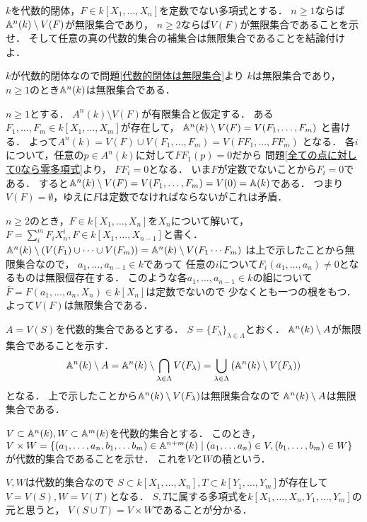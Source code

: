 \begin{prob}
  $k$を代数的閉体，$F\in k[X_1,\dots,X_n]$を定数でない多項式とする．
  $n\ge 1$ならば$\mathbb{A}^n(k) \setminus V(F)$が無限集合であり，
  $n\ge 2$ならば$V(F)$が無限集合であることを示せ．
  そして任意の真の代数的集合の補集合は無限集合であることを結論付けよ．
\end{prob}
\begin{ans}
  $k$が代数的閉体なので問題\ref{代数的閉体は無限集合}より
  $k$は無限集合であり，$n\ge 1$のとき$\mathbb{A}^n(k)$は無限集合である．
  
  $n\ge 1$とする．
  $A^n(k) \setminus V(F)$が有限集合と仮定する．
  ある$F_1, \dots, F_m \in k[X_1, \dots, X_m]$が存在して，
  $\mathbb{A}^n(k) \setminus V(F) = V(F_1, \dots , F_m)$
  と書ける．
  よって$A^n(k) = V(F) \cup V(F_1, \dots , F_m) = V( FF_1, \dots, FF_m)$
  となる．
  各$i$について，任意の$p \in A^n(k)$に対して$FF_1(p) = 0$だから
  問題\ref{全ての点に対して0なら零多項式}より，
  $FF_i = 0$となる．
  いま$F$が定数でないことから$F_i = 0$である．
  すると$\mathbb{A}^n(k) \setminus V(F) = V(F_1, \dots , F_m) = V(0) = \mathbb{A}(k)$である．
  つまり$V(F) = \emptyset$，ゆえに$F$は定数でなければならないがこれは矛盾．

  $n \ge 2$のとき，$F \in k[X_1,\dots,X_n]$を$X_n$について解いて，
  $F = \sum_{i}^m F_i X_n^i, F \in k[X_1,\dots,X_{n-1}]$と書く．
  $\mathbb{A}^n(k) \setminus (V(F_1) \cup \cdots \cup V(F_m)) = \mathbb{A}^n(k) \setminus V( F_1\cdots F_m )$
  は上で示したことから無限集合なので，
  $a_1, \dots, a_{n-1} \in k$であって
  任意の$i$について$F_i(a_1, \dots, a_n) \ne 0$となるものは無限個存在する．
  このような各$a_1, \dots, a_{n-1} \in k$の組について
  $\bar{F} = F(a_1, \dots, a_n, X_n) \in k[X_n]$は定数でないので
  少なくとも一つの根をもつ．
  よって$V(F)$は無限集合である．

  $A = V(S)$を代数的集合であるとする．
  $S = \{ F_{\lambda} \}_{\lambda\in\Lambda}$とおく．
  $\mathbb{A}^n(k) \setminus A$が無限集合であることを示す．
  \[ \mathbb{A}^n(k) \setminus A
  = \mathbb{A}^n(k) \setminus \bigcap_{\lambda\in\Lambda} V(F_{\lambda})
  = \bigcup_{\lambda\in\Lambda} \left( \mathbb{A}^n(k) \setminus V(F_{\lambda}) \right) \]
  となる．
  上で示したことから$\mathbb{A}^n(k) \setminus V(F_{\lambda})$は無限集合なので
  $ \mathbb{A}^n(k) \setminus A$は無限集合である．
\end{ans}

\begin{prob}
  $V \subset \mathbb{A}^{n}(k), W\subset \mathbb{A}^m(k)$を代数的集合とする．
  このとき，
  $V\times W = \{ (a_1, \dots, a_n, b_1, \dots b_m) \in \mathbb{A}^{n+m}(k) \mid (a_1, \dots a_n) \in V, (b_1, \dots, b_m) \in W \}$
  が代数的集合であることを示せ．
  これを$V$と$W$の積という．
\end{prob}
\begin{ans}
  $V,W$は代数的集合なので
  $S\subset k[X_1,\dots,X_n], T \subset k[Y_1, \dots, Y_m]$が存在して
  $V = V( S ), W = V( T )$となる．
  $S,T$に属する多項式を$k[X_1,\dots,X_n,Y_1,\dots,Y_m]$の元と思うと，
  $V(S \cup T) = V \times W$であることが分かる．
\end{ans}
